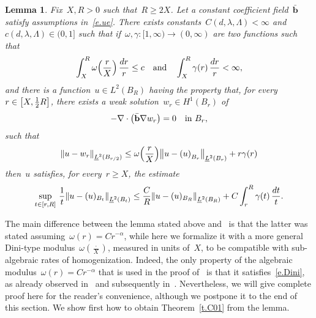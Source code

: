 \documentclass[11pt,twoside]{article} %
\numberwithin{equation}{section}
\newtheorem{lemma}[theorem]{Lemma}
\theoremstyle{definition}
\let\originalleft\left
\let\originalright\right
\renewcommand{\left}{\mathopen{}\mathclose\bgroup\originalleft}
\renewcommand{\right}{\aftergroup\egroup\originalright}
\newcommand{\bhom}{\bar{\mathbf{b}}}
\begin{document}
\begin{lemma}
\label{l.harm.approx}
Fix~$X,R >0$ such that~$R \geq 2X$. Let a constant coefficient field~$\bhom$ satisfy assumptions in~\eqref{e.ue}. There exists constants~$C(d,\lambda,\Lambda)<\infty$ and~$c(d,\lambda,\Lambda) \in (0,1]$ such that if~$\omega,\gamma:[1,\infty) \to (0,\infty)$ are two functions such that 
\begin{equation} 
\label{e.Dini}
\int_{X}^R \omega\Bigl( \frac{r}X \Bigr) \, \frac{dr}{r} \leq c
\quad \mbox{and} \quad \int_{X}^R  \gamma(r)  \, \frac{dr}{r} < \infty,
\end{equation}
and there is a function~$u\in L^2(B_{R})$ having the property that, for every~$r\in \left[ X, \frac12R \right]$, there exists a weak solution~$w_r \in H^1(B_{r})$ of 
\begin{equation*} \label{}
-\nabla \cdot \left( \bhom \nabla w_r \right) = 0 \quad \mbox{in} \ B_{r},
\end{equation*}
such that 
\begin{equation} 
\label{e.wharmapproxit}
\left\| u - w_r \right\|_{\underline{L}^2(B_{r/2})} \leq    
\omega\Bigl( \frac{r}X \Bigr)
\left\| u - \left( u \right)_{B_{r}} \right\|_{\underline{L}^2(B_{r})}  + r \gamma(r) 
\end{equation}
then~$u$ satisfies, for every~$r \geq X$, the estimate
\begin{equation}
\label{e.elipsc}
\sup_{t \in \left[r, R\right]} \,
\frac1{t} \left\| u - ( u )_{B_{t}} \right\|_{\underline{L}^2(B_{t})}
\leq
\frac{C}{R} \left\| u - ( u )_{B_{R}} \right\|_{\underline{L}^2(B_{R})} 
+ C \int_{r}^R \gamma(t) \, \frac{dt}{t}
.
\end{equation}
\end{lemma}

The main difference between the lemma stated above and~\cite[Lemma 5.1]{AS} is that the latter was stated assuming~$\omega(r)= Cr^{-\alpha}$, while here we formalize it with a more general Dini-type modulus~$\omega(\frac \cdot X)$, measured in units of~$X$, to be compatible with sub-algebraic rates of homogenization. Indeed,
the only property of the algebraic modulus~$\omega(r)= Cr^{-\alpha}$ that is used in the proof of~\cite[Lemma 5.1]{AS} is that it satisfies~\eqref{e.Dini}, as already observed in~\cite[Section 3]{ASh} and subsequently in~\cite{FO}. Nevertheless, we will give complete proof here for the reader's convenience, although we postpone it to the end of this section. We show first how to obtain Theorem~\ref{t.C01} from the lemma. 
\end{document}
